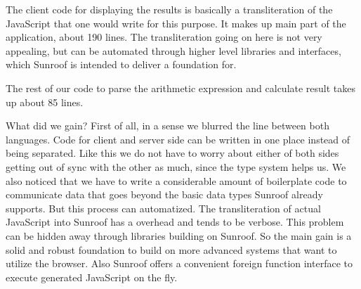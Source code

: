 The client code for displaying the results is basically a 
transliteration of the JavaScript that one would write for this 
purpose. It makes up main part of the application, about 190 lines.
The transliteration going on here is not very appealing, but can 
be automated through higher level libraries and interfaces, which
Sunroof is intended to deliver a foundation for.

The rest of our code to parse the arithmetic expression and calculate 
result takes up about 85 lines. 

What did we gain? First of all, in a sense we blurred the line between
both languages. Code for client and server side can be written in one place
instead of being separated. Like this we do not have to worry about 
either of both sides getting out of sync with the other as much, since
the type system helps us. We also noticed that we have to write
a considerable amount of boilerplate code to communicate data that goes beyond 
the basic data types Sunroof already supports. But this process can automatized.
The transliteration of actual JavaScript into Sunroof has a overhead and
tends to be verbose. This problem can be hidden away through libraries building
on Sunroof. So the main gain is a solid and robust foundation to build
on more advanced systems that want to utilize the browser. Also Sunroof 
offers a convenient foreign function interface to execute generated 
JavaScript on the fly.


